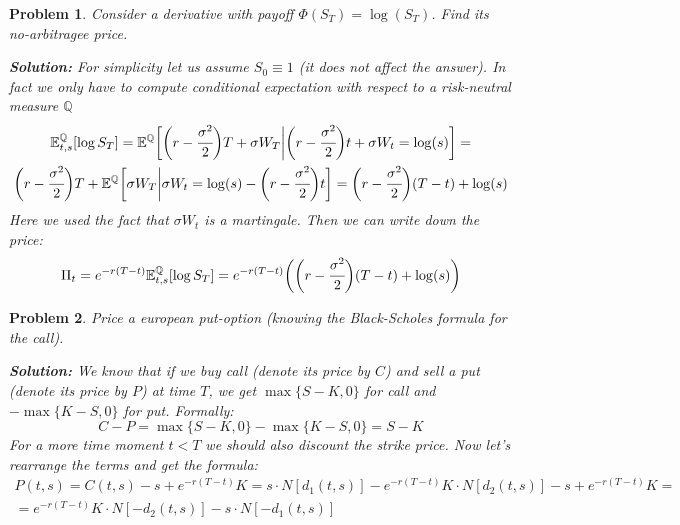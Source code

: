 \documentclass[a4paper, 12pt]{article}
\theoremstyle{problemstyle}
\newtheorem{problem}{Problem}[section]
\newenvironment{solution}
{\textit{\textbf{Solution:}}}
{}
\newcommand{\E}{\mathbb{E}}
\begin{document}
\begin{problem}
	Consider a derivative with payoff $\Phi(S_T) = \log(S_T)$. Find its no-arbitragee price.
	
	\begin{solution}
		For simplicity let us assume $S_0 \equiv 1$ (it does not affect the answer). In fact we only have to compute conditional expectation with respect to a risk-neutral measure $\mathbb{Q}$
		\begin{multline}
		\E^{\mathbb{Q}}_{t, s}[\log S_T] = 
		\E^{\mathbb{Q}}\bigg[ 
		\bigg(r  - \cfrac{\sigma^2}{2}\bigg)T + \sigma W_T \bigg| 
		\bigg(r  - \cfrac{\sigma^2}{2}\bigg)t + \sigma W_t = \log(s)
		\bigg] = \\
		\bigg(r  - \cfrac{\sigma^2}{2}\bigg)T  +
		\E^{\mathbb{Q}}\bigg[ \sigma W_T \bigg| 
		\sigma W_t = \log(s) - \bigg(r  - \cfrac{\sigma^2}{2}\bigg)t 
		\bigg] = 
			\bigg(r  - \cfrac{\sigma^2}{2}\bigg)(T-t) +\log(s) 
		\end{multline}
		Here we used the fact that $\sigma W_t$ is a martingale. Then we can write down the price:
		\begin{equation}
		\Pi_t = e^{-r(T-t)}\E^{\mathbb{Q}}_{t, s}[\log S_T]  = e^{-r(T-t)}\bigg(\bigg(r  - \cfrac{\sigma^2}{2}\bigg)(T-t) +\log(s)\bigg) 
		\end{equation}
	\end{solution}
\end{problem}

\begin{problem}
	Price a european put-option (knowing the Black-Scholes formula for the call).
	
	\begin{solution}
		We know that if we buy call (denote its price by $C$) and sell a put (denote its price by $P$) at time $T$, we get $\max\{S-K, 0\}$ for call and $-\max\{K-S, 0\}$  for put.  Formally:
		\begin{equation}
		C - P = \max\{S-K, 0\} - \max\{K-S, 0\} = S - K%
		\end{equation}
		For a more time moment $t < T$ we should also discount the strike price. Now let's rearrange the terms and get the formula:
		\begin{multline}
		P(t, s)  = C (t, s)- s+e^{-r(T-t)}K = 
		 s \cdot N[d_1(t, s)] - e^{-r(T-t)}K \cdot N[d_2(t, s)]  - s + e^{-r(T-t)}K = \\
		 = e^{-r(T-t)}K \cdot N[-d_2(t, s)]  - s \cdot N[-d_1(t, s)]
		\end{multline}
	\end{solution}
\end{problem}
\end{document}
